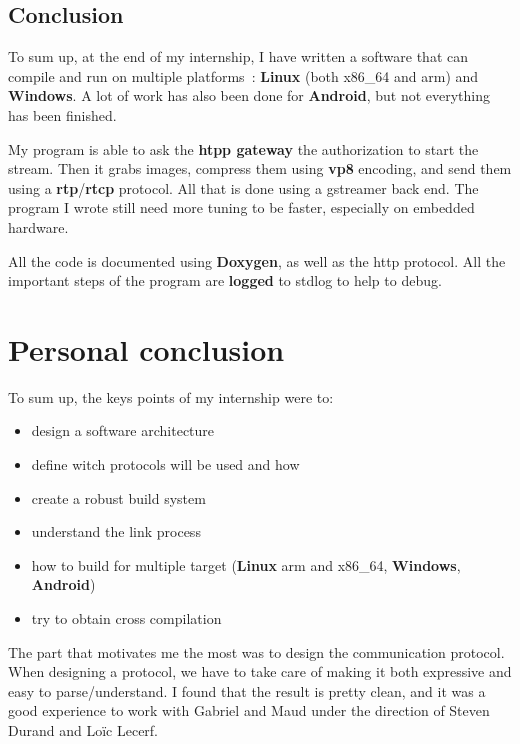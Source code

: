 \documentclass[a4paper,11pt]{custom}
\newcommand{\rtp}{\textbf{rtp}\xspace}
\newcommand{\rtcp}{\textbf{rtcp}\xspace}
\newcommand{\vpx}{\textbf{vp8}\xspace}
\newcommand{\linux}{\textbf{Linux}\xspace}
\newcommand{\win}{\textbf{Windows}\xspace}
\newcommand{\android}{\textbf{Android}\xspace}
\begin{document}
\section{Conclusion}

To sum up, at the end of my internship, I have written a software that can compile
and run on multiple platforms~: \linux{} (both x86\_64 and arm) and \win. A lot
of work has also been done for \android, but not everything has been finished.

My program is able to ask the \textbf{htpp gateway} the authorization to start the stream.
Then it grabs images, compress them using \vpx{} encoding, and send them using a
\rtp{}/\rtcp{} protocol. All that is done using a gstreamer back end. The program I
wrote still need more tuning to be faster, especially on embedded hardware.

All the code is documented using \textbf{Doxygen}, as well as the http protocol.
All the important steps of the program are \textbf{logged} to stdlog to help
to debug.

\chapter{Personal conclusion}

To sum up, the keys points of my internship were to:
\begin{multicols}{2}
\begin{itemize}
\item design a software architecture
\item define witch protocols will be used and how
\item create a robust build system
\item understand the link process
\item how to build for multiple target (\linux{} arm and x86\_64, \win, \android)
\item try to obtain cross compilation
\end{itemize}
\end{multicols}

The part that motivates me the most was to design the communication protocol.
When designing a protocol, we have to take care of making it both expressive and
easy to parse/understand. I found that the result is pretty clean, and it was a
good experience to work with Gabriel and Maud under the direction of Steven
Durand and Loïc Lecerf.
\end{document}
